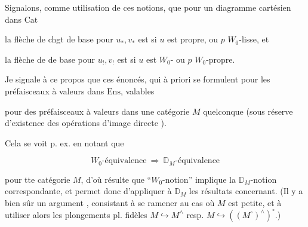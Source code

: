 Signalons, comme  utilisation de ces notions, que pour un diagramme cartésien dans $\mathrm{Cat}$


la flèche de chgt de base pour $u_*,v_*$  est  si $u$ est propre, ou $p$ $W_0$-lisse, et

la flèche de  de base pour $u_!,v_!$ est  si $u$ est $W_0$- ou $p$ $W_0$-propre.


Je signale à ce propos que ces énoncés, qui à priori se  formulent pour les préfaisceaux à valeurs dans $\mathrm{Ens}$,  valables

pour des préfaisceaux à valeurs dans une catégorie $M$ quelconque (sous réserve d'existence des opérations  d'image directe  ).

Cela se voit p. ex. en notant que

\[
W_0\text{-équivalence}\ \Longrightarrow\ \mathbb{D}_M\text{-équivalence}\tag*{(3.10.)}
\]


pour tte catégorie $M$, d'où résulte que  \inserted{(*)} ``$W_0$-notion'' implique la $\mathbb{D}_M$-notion correspondante, et permet donc d'appliquer à $\mathbb{D}_M$ les résultats  concernant. (Il y a bien sûr un argument  , consistant à se ramener au cas où $M$ est petite, et à utiliser alors les plongements pl. fidèles $M\hookrightarrow M^\wedge$ resp. $M\hookrightarrow((M^\circ)^\wedge)^\circ$.)

